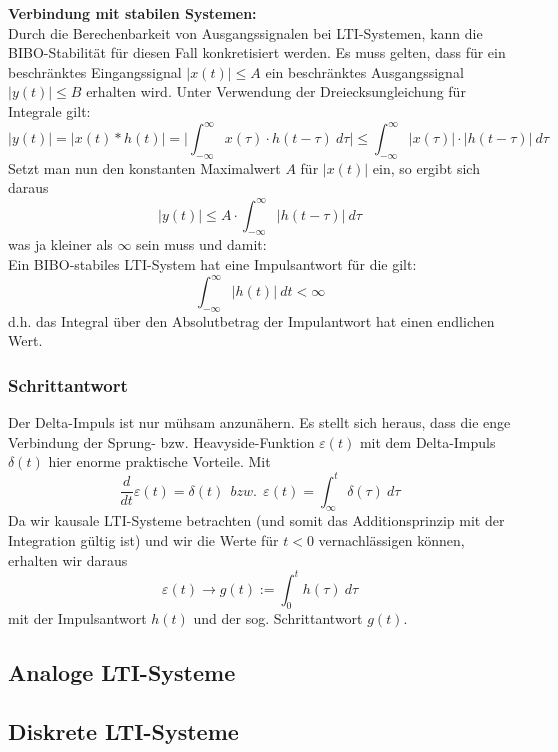 \documentclass[12pt,a4paper]{scrartcl}
\begin{document}
    \noindent \textbf{Verbindung mit stabilen Systemen:} \\
    \noindent Durch die Berechenbarkeit von Ausgangssignalen bei LTI-Systemen, kann die BIBO-Stabilität für diesen Fall konkretisiert werden. 
    Es muss gelten, dass für ein beschränktes Eingangssignal $|x(t)| \leq A$ ein beschränktes Ausgangssignal $|y(t)| \leq B$ erhalten wird. 
    Unter Verwendung der Dreiecksungleichung für Integrale gilt:
    \begin{equation}\label{eq:29}|y(t)| = | x(t) * h(t)| = \bigg| \int_{-\infty}^{\infty}x(\tau)\cdot h(t- \tau)\ d \tau \bigg| \leq \int_{-\infty}^{\infty}|x(\tau)|\cdot |h(t- \tau)| \ d \tau \end{equation}
    Setzt man nun den konstanten Maximalwert $A$ für $|x(t)|$ ein, so ergibt sich daraus
    $$|y(t)| \leq A \cdot \int_{-\infty}^{\infty} |h(t-\tau)|\ d\tau$$
    was ja kleiner als $\infty$ sein muss und damit:\\

    Ein BIBO-stabiles LTI-System hat eine Impulsantwort für die gilt:
    \begin{equation}
      \label{eq:30}
      \int_{-\infty}^{\infty} |h(t)|\ dt < \infty
    \end{equation}
    \indent d.h. das Integral über den Absolutbetrag der Impulantwort hat einen endlichen Wert.

    \subsubsection{Schrittantwort}
    \label{sec:sub:sub:schrittantwort}

    \noindent    Der Delta-Impuls ist nur mühsam anzunähern. Es stellt sich heraus, dass die enge Verbindung der Sprung- bzw. Heavyside-Funktion $\varepsilon(t)$ mit dem Delta-Impuls $\delta(t)$ hier enorme praktische Vorteile.
    Mit
    $$ \frac{d}{dt}\varepsilon(t) = \delta (t)\ \ bzw.\ \ \varepsilon(t) = \int_{\infty}^{t} \delta(\tau)\ d\tau$$
    Da wir kausale LTI-Systeme betrachten (und somit das Additionsprinzip mit der Integration gültig ist) und wir die Werte für $t<0$ vernachlässigen können, erhalten wir daraus
    \begin{equation}\label{eq:31} \varepsilon(t) \to g(t) := \int_{0}^{t}h(\tau)\ d\tau\end{equation}
    mit der Impulsantwort $h(t)$ und der sog. Schrittantwort $g(t)$.




  \subsection{Analoge LTI-Systeme}
  \label{sec:sub:analoge-lti-systeme}

  \subsection{Diskrete LTI-Systeme}
  \label{sec:sub:diskrete-lti-systeme}
  
\end{document}
